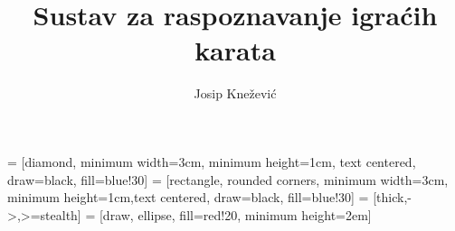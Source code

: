 \documentclass[times, zavrsni, numeric, utf8]{fer}
\begin{document}
 = [diamond, minimum width=3cm, minimum height=1cm, text centered, draw=black, fill=blue!30]
 = [rectangle, rounded corners, minimum width=3cm, minimum height=1cm,text centered, draw=black, fill=blue!30]
 = [thick,->,>=stealth]
 = [draw, ellipse, fill=red!20, minimum height=2em]


\title{Sustav za raspoznavanje igraćih karata}

\author{Josip Knežević}

\maketitle



\zahvala{}

\tableofcontents
\end{document}
